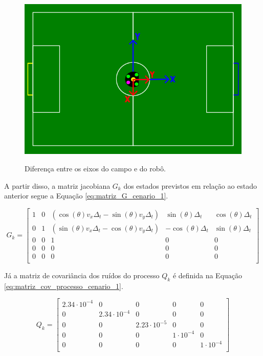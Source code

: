 \documentclass[acronym, symbols, table, deposito]{fei}
\begin{document}
			\begin{figure}[!htb]
				\centering
				\caption{Diferença entre os eixos do campo e do robô.}
				\includegraphics[width=1.0\textwidth]{representacao_eixos_robo_campo.png}
				\label{fig:representacao_eixos_robo_campo}
			\end{figure}
		
			 A partir disso, a matriz jacobiana $G_k$ dos estados previstos em relação ao estado anterior segue a Equação \eqref{eq:matriz_G_cenario_1}.
		
			\begin{equation}\label{eq:matriz_G_cenario_1}
			 	G_{k} = \begin{bmatrix}
			 		1 & 0 & (\cos(\theta)v_x\Delta_t - \sin(\theta)v_y\Delta_t) & \sin(\theta)\Delta_t & \cos(\theta)\Delta_t \\
			 		0 & 1 & (\sin(\theta)v_x\Delta_t - \cos(\theta)v_y\Delta_t) & -\cos(\theta)\Delta_t & \sin(\theta)\Delta_t \\
			 		0 & 0 & 1 & 0 & 0 \\
			 		0 & 0 & 0 & 0 & 0 \\
			 		0 & 0 & 0 & 0 & 0 \\
			 	\end{bmatrix}
			 \end{equation}
		 
		 	Já a matriz de covariância dos ruídos do processo $Q_{k}$ é definida na Equação \eqref{eq:matriz_cov_processo_cenario_1}.
		 	
		 	\begin{equation}\label{eq:matriz_cov_processo_cenario_1}
		 		Q_{k} = \begin{bmatrix}
		 			2.34\cdot10^{-4} & 0 & 0 & 0 & 0 \\
		 			0 & 2.34\cdot10^{-4} & 0 & 0 & 0 \\
		 			0 & 0 & 2.23\cdot10^{-5} & 0 & 0 \\
		 			0 & 0 & 0 & 1\cdot10^{-4} & 0 \\
		 			0 & 0 & 0 & 0 & 1\cdot10^{-4} \\
		 		\end{bmatrix}
		 	\end{equation}
		 
\end{document}

